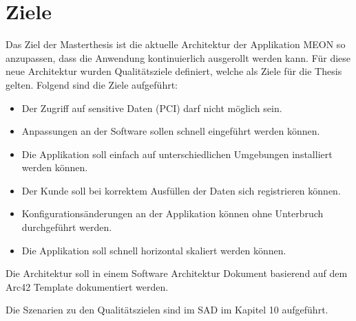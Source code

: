 \chapter{Ziele}

Das Ziel der Masterthesis ist die aktuelle Architektur der Applikation MEON so anzupassen, dass die Anwendung kontinuierlich ausgerollt werden kann. Für diese neue Architektur wurden Qualitätsziele definiert, welche als Ziele für die Thesis gelten. Folgend sind die Ziele aufgeführt:

\begin{itemize}
	\item Der Zugriff auf sensitive Daten (PCI) darf nicht möglich sein.
	\item Anpassungen an der Software sollen schnell eingeführt werden können.
	\item Die Applikation soll einfach auf unterschiedlichen Umgebungen installiert werden können.
	\item Der Kunde soll bei korrektem Ausfüllen der Daten sich registrieren können.
	\item Konfigurationsänderungen an der Applikation können ohne Unterbruch durchgeführt werden.
	\item Die Applikation soll schnell horizontal skaliert werden können.
\end{itemize}

Die Architektur soll in einem Software Architektur Dokument basierend auf dem Arc42 Template dokumentiert werden.

Die Szenarien zu den Qualitätszielen sind im SAD im Kapitel 10 aufgeführt.
